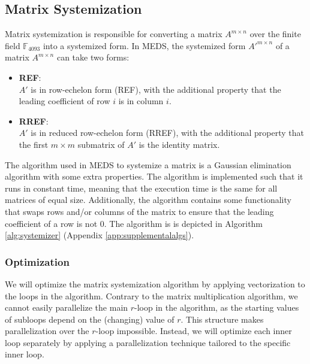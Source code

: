 \documentclass[11pt,a4paper]{report}
\theoremstyle{definition}
\begin{document}
\subsection{Matrix Systemization}
\label{sec:matrixsystemization}
Matrix systemization is responsible for converting a matrix $A^{m \times n}$ over the finite field $\mathbb{F}_{4093}$ into a systemized form. In MEDS, the systemized form $A'^{m \times n}$ of a matrix $A^{m \times n}$ can take two forms:
\begin{itemize}
  \item \textbf{REF}:\\
  $A'$ is in row-echelon form (REF), with the additional property that the leading coefficient of row $i$ is in column $i$.
  \item \textbf{RREF}:\\
  $A'$ is in reduced row-echelon form (RREF), with the additional property that the first $m \times m$ submatrix of $A'$ is the identity matrix.
\end{itemize}

The algorithm used in MEDS to systemize a matrix is a Gaussian elimination algorithm with some extra properties. The algorithm is implemented such that it runs in constant time, meaning that the execution time is the same for all matrices of equal size. Additionally, the algorithm contains some functionality that swaps rows and/or columns of the matrix to ensure that the leading coefficient of a row is not 0. The algorithm is is depicted in Algorithm \ref{alg:systemizer} (Appendix \ref{app:supplementalalgs}).

\subsubsection{Optimization}
\label{sec:matrixsystemizationoptimization}
We will optimize the matrix systemization algorithm by applying vectorization to the loops in the algorithm. Contrary to the matrix multiplication algorithm, we cannot easily parallelize the main $r$-loop in the algorithm, as the starting values of subloops depend on the (changing) value of $r$. This structure makes parallelization over the $r$-loop impossible. Instead, we will optimize each inner loop separately by applying a parallelization technique tailored to the specific inner loop.
\end{document}
